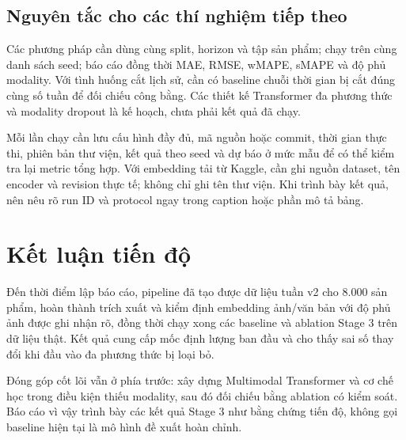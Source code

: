\documentclass[12pt,a4paper,oneside]{article}
\begin{document}
\subsection*{Nguyên tắc cho các thí nghiệm tiếp theo}
Các phương pháp cần dùng cùng split, horizon và tập sản phẩm; chạy trên cùng danh sách seed; báo cáo đồng thời MAE, RMSE, wMAPE, sMAPE và độ phủ modality. Với tình huống cắt lịch sử, cần có baseline chuỗi thời gian bị cắt đúng cùng số tuần để đối chiếu công bằng. Các thiết kế Transformer đa phương thức và modality dropout là kế hoạch, chưa phải kết quả đã chạy.

Mỗi lần chạy cần lưu cấu hình đầy đủ, mã nguồn hoặc commit, thời gian thực thi, phiên bản thư viện, kết quả theo seed và dự báo ở mức mẫu để có thể kiểm tra lại metric tổng hợp. Với embedding tải từ Kaggle, cần ghi nguồn dataset, tên encoder và revision thực tế; không chỉ ghi tên thư viện. Khi trình bày kết quả, nên nêu rõ run ID và protocol ngay trong caption hoặc phần mô tả bảng.

\clearpage
\section{Kết luận tiến độ}
Đến thời điểm lập báo cáo, pipeline đã tạo được dữ liệu tuần v2 cho 8.000 sản phẩm, hoàn thành trích xuất và kiểm định embedding ảnh/văn bản với độ phủ ảnh được ghi nhận rõ, đồng thời chạy xong các baseline và ablation Stage 3 trên dữ liệu thật. Kết quả cung cấp mốc định lượng ban đầu và cho thấy sai số thay đổi khi đầu vào đa phương thức bị loại bỏ.

Đóng góp cốt lõi vẫn ở phía trước: xây dựng Multimodal Transformer và cơ chế học trong điều kiện thiếu modality, sau đó đối chiếu bằng ablation có kiểm soát. Báo cáo vì vậy trình bày các kết quả Stage 3 như bằng chứng tiến độ, không gọi baseline hiện tại là mô hình đề xuất hoàn chỉnh.
\end{document}
